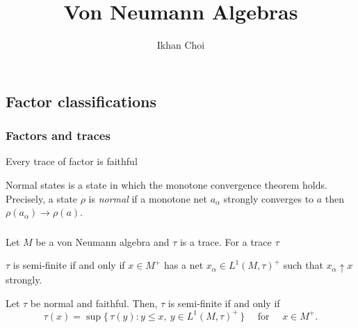 \documentclass{../../large}
\begin{document}
\title{Von Neumann Algebras}
\author{Ikhan Choi}
\maketitle
\tableofcontents

\iffalse
normality of maps
type classifications
commutative vN alg
modular theory
automorphism groups
injectivity
II ergodic theory, rigidity
III
subfactors
Connes embeddability
\fi


\part{}

\chapter{Factor classifications}


\section{Factors and traces}


Every trace of factor is faithful

\begin{prb}
Normal states is a state in which the monotone convergence theorem holds.
Precisely, a state $\rho$ is \emph{normal} if a monotone net $a_\alpha$ strongly converges to $a$ then $\rho(a_\alpha)\to\rho(a)$.
\end{prb}


\section{}
\begin{prb}
Let $M$ be a von Neumann algebra and $\tau$ is a trace.
For a trace $\tau$
\begin{parts}
\item $\tau$ is semi-finite if and only if $x\in M^+$ has a net $x_\alpha\in L^1(M,\tau)^+$ such that $x_\alpha\uparrow x$ strongly.
\item Let $\tau$ be normal and faithful. Then, $\tau$ is semi-finite if and only if
\[\tau(x)=\sup\{\,\tau(y):y\le x,\ y\in L^1(M,\tau)^+\,\}\quad\text{ for }\quad x\in M^+.\]
\end{parts}
\end{prb}

\section{}
\end{document}
